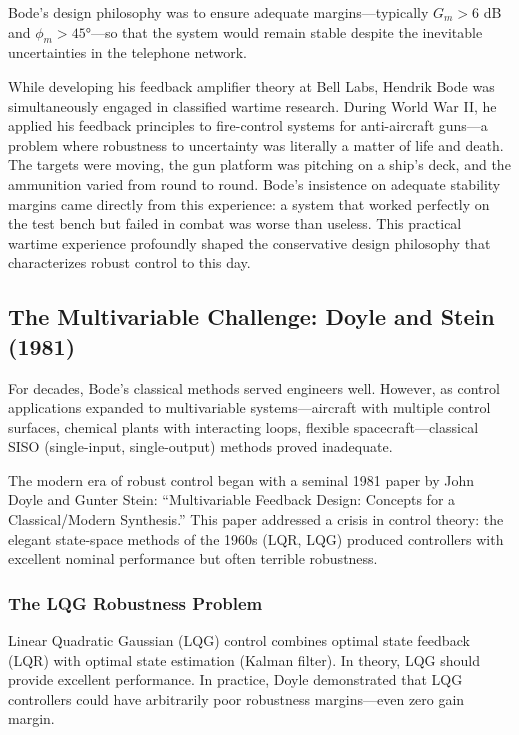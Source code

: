 Bode's design philosophy was to ensure adequate margins---typically $G_m > 6$ dB and $\phi_m > 45°$---so that the system would remain stable despite the inevitable uncertainties in the telephone network.

\begin{historicalbox}
While developing his feedback amplifier theory at Bell Labs, Hendrik Bode was simultaneously engaged in classified wartime research. During World War II, he applied his feedback principles to fire-control systems for anti-aircraft guns---a problem where robustness to uncertainty was literally a matter of life and death. The targets were moving, the gun platform was pitching on a ship's deck, and the ammunition varied from round to round. Bode's insistence on adequate stability margins came directly from this experience: a system that worked perfectly on the test bench but failed in combat was worse than useless. This practical wartime experience profoundly shaped the conservative design philosophy that characterizes robust control to this day.
\end{historicalbox}

\subsection{The Multivariable Challenge: Doyle and Stein (1981)}
\label{subsec:doyle_stein}

For decades, Bode's classical methods served engineers well. However, as control applications expanded to multivariable systems---aircraft with multiple control surfaces, chemical plants with interacting loops, flexible spacecraft---classical SISO (single-input, single-output) methods proved inadequate.

The modern era of robust control began with a seminal 1981 paper by John Doyle and Gunter Stein: ``Multivariable Feedback Design: Concepts for a Classical/Modern Synthesis.'' This paper addressed a crisis in control theory: the elegant state-space methods of the 1960s (LQR, LQG) produced controllers with excellent nominal performance but often terrible robustness.

\subsubsection{The LQG Robustness Problem}

Linear Quadratic Gaussian (LQG) control combines optimal state feedback (LQR) with optimal state estimation (Kalman filter). In theory, LQG should provide excellent performance. In practice, Doyle demonstrated that LQG controllers could have arbitrarily poor robustness margins---even zero gain margin.

